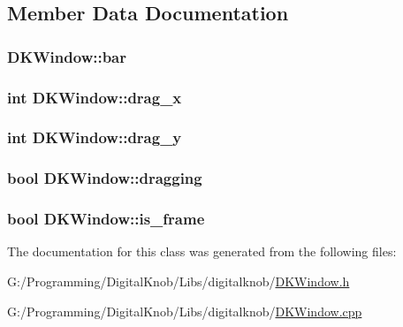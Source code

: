 \subsection{Member Data Documentation}
\hypertarget{class_d_k_window_a89bde6d6cdc0d740daf6c4b5967f9b5f}{
\subsubsection[{bar}]{ D\-K\-Window\-::bar}}\label{class_d_k_window_a89bde6d6cdc0d740daf6c4b5967f9b5f}
\hypertarget{class_d_k_window_a7ab30185d7d22f7caea63b8f84e0e6b1}{
\subsubsection[{drag\-\_\-x}]{\setlength{\rightskip}{0pt plus 5cm}int D\-K\-Window\-::drag\-\_\-x}}\label{class_d_k_window_a7ab30185d7d22f7caea63b8f84e0e6b1}
\hypertarget{class_d_k_window_a40f644b725e4169a5efc17ec3345ca73}{
\subsubsection[{drag\-\_\-y}]{\setlength{\rightskip}{0pt plus 5cm}int D\-K\-Window\-::drag\-\_\-y}}\label{class_d_k_window_a40f644b725e4169a5efc17ec3345ca73}
\hypertarget{class_d_k_window_a9c3b07e8f9e9f7b5a2fdfeb5413190b6}{
\subsubsection[{dragging}]{\setlength{\rightskip}{0pt plus 5cm}bool D\-K\-Window\-::dragging}}\label{class_d_k_window_a9c3b07e8f9e9f7b5a2fdfeb5413190b6}
\hypertarget{class_d_k_window_a11d05eb7b6f266118231fa6c502d56d4}{
\subsubsection[{is\-\_\-frame}]{\setlength{\rightskip}{0pt plus 5cm}bool D\-K\-Window\-::is\-\_\-frame}}\label{class_d_k_window_a11d05eb7b6f266118231fa6c502d56d4}


The documentation for this class was generated from the following files\-:\begin{DoxyCompactItemize}
\item 
G\-:/\-Programming/\-Digital\-Knob/\-Libs/digitalknob/\hyperlink{_d_k_window_8h}{D\-K\-Window.\-h}\item 
G\-:/\-Programming/\-Digital\-Knob/\-Libs/digitalknob/\hyperlink{_d_k_window_8cpp}{D\-K\-Window.\-cpp}\end{DoxyCompactItemize}
